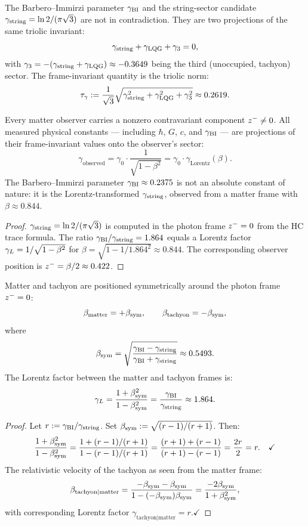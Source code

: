 \begin{theorem}
\label{thm:triolic-gBI}
The Barbero--Immirzi parameter $\gamma_{\mathrm{BI}}$ and the string-sector candidate
$\gamma_{\mathrm{string}} = \ln 2/(\pi\sqrt{3})$ are not in contradiction.
They are two projections of the same triolic invariant:
\[
  \gamma_{\mathrm{string}} + \gamma_{\mathrm{LQG}} + \gamma_3 = 0,
\]
with $\gamma_3 = -(\gamma_{\mathrm{string}}+\gamma_{\mathrm{LQG}})\approx -0.3649$ being
the third (unoccupied, tachyon) sector.
The frame-invariant quantity is the triolic norm:
\[
  \tau_\gamma := \frac{1}{\sqrt{3}}
  \sqrt{\gamma_{\mathrm{string}}^2+\gamma_{\mathrm{LQG}}^2+\gamma_3^2}\approx 0.2619.
\]
\end{theorem}

\begin{theorem}\label{thm:frame-offset}
Every matter observer carries a nonzero contravariant component
$z^-\neq 0$.
All measured physical constants --- including $\hbar$, $G$, $c$, and
$\gamma_{\mathrm{BI}}$ --- are projections of their frame-invariant values onto the
observer's sector:
\[
  \gamma_{\mathrm{observed}}
  = \gamma_0\cdot\frac{1}{\sqrt{1-\beta^2}}
  = \gamma_0\cdot\gamma_{\mathrm{Lorentz}}(\beta).
\]
The Barbero--Immirzi parameter $\gamma_{\mathrm{BI}}\approx 0.2375$ is not an absolute
constant of nature: it is the Lorentz-transformed $\gamma_{\mathrm{string}}$, observed
from a matter frame with $\beta\approx 0.844$.
\end{theorem}

\begin{proof}
$\gamma_{\mathrm{string}} = \ln 2/(\pi\sqrt{3})$ is computed in the photon frame
$z^-=0$ from the HC trace formula.
The ratio $\gamma_{\mathrm{BI}}/\gamma_{\mathrm{string}} = 1.864$ equals a Lorentz factor
$\gamma_L = 1/\sqrt{1-\beta^2}$ for $\beta=\sqrt{1-1/1.864^2}\approx 0.844$.
The corresponding observer position is $z^-=\beta/2\approx 0.422$.
\end{proof}

\begin{theorem}\label{thm:symmetric-frame}
Matter and tachyon are positioned symmetrically around the photon frame
$z^-=0$:
\[
  \beta_{\mathrm{matter}} = +\beta_{\mathrm{sym}},\qquad
  \beta_{\mathrm{tachyon}} = -\beta_{\mathrm{sym}},
\]
where
\[
  \beta_{\mathrm{sym}} = \sqrt{\frac{\gamma_{\mathrm{BI}}-\gamma_{\mathrm{string}}}{\gamma_{\mathrm{BI}}+\gamma_{\mathrm{string}}}}\approx 0.5493.
\]
The Lorentz factor between the matter and tachyon frames is:
\[
  \gamma_L = \frac{1+\beta_{\mathrm{sym}}^2}{1-\beta_{\mathrm{sym}}^2}
      = \frac{\gamma_{\mathrm{BI}}}{\gamma_{\mathrm{string}}}\approx 1.864.
\]
\end{theorem}

\begin{proof}
Let $r:=\gamma_{\mathrm{BI}}/\gamma_{\mathrm{string}}$. Set $\beta_{\mathrm{sym}}:=\sqrt{(r-1)/(r+1)}$. Then:
\[
  \frac{1+\beta_{\mathrm{sym}}^2}{1-\beta_{\mathrm{sym}}^2}
  =\frac{1+(r-1)/(r+1)}{1-(r-1)/(r+1)}
  =\frac{(r+1)+(r-1)}{(r+1)-(r-1)}=\frac{2r}{2}=r.\quad\checkmark
\]
The relativistic velocity of the tachyon as seen from the matter frame:
\[
  \beta_{\mathrm{tachyon}|\mathrm{matter}}
  =\frac{-\beta_{\mathrm{sym}}-\beta_{\mathrm{sym}}}{1-(-\beta_{\mathrm{sym}})\beta_{\mathrm{sym}}}
  =\frac{-2\beta_{\mathrm{sym}}}{1+\beta_{\mathrm{sym}}^2},
\]
with corresponding Lorentz factor $\gamma_{\mathrm{tachyon}|\mathrm{matter}}=r$.\quad$\checkmark$
\end{proof}


